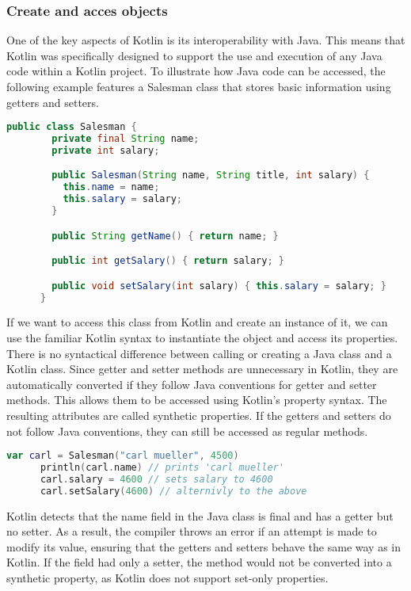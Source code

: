 \documentclass[a4paper, 11pt]{article}
\begin{document}
  \subsubsection{Create and acces objects}
    One of the key aspects of Kotlin is its interoperability with Java. This means that Kotlin was specifically designed to support the use and execution of any Java code within a Kotlin project. To illustrate how Java code can be accessed, the following example features a Salesman class that stores basic information using getters and setters.
    \begin{lstlisting}[language=Java,title={Example java class}]
      public class Salesman {
        private final String name;
        private int salary;

        public Salesman(String name, String title, int salary) {
          this.name = name;
          this.salary = salary;
        }

        public String getName() { return name; }

        public int getSalary() { return salary; }

        public void setSalary(int salary) { this.salary = salary; }
      }
    \end{lstlisting}
    If we want to access this class from Kotlin and create an instance of it, we can use the familiar Kotlin syntax to instantiate the object and access its properties. There is no syntactical difference between calling or creating a Java class and a Kotlin class. Since getter and setter methods are unnecessary in Kotlin, they are automatically converted if they follow Java conventions for getter and setter methods. This allows them to be accessed using Kotlin's property syntax. The resulting attributes are called synthetic properties. If the getters and setters do not follow Java conventions, they can still be accessed as regular methods.
    \begin{lstlisting}[language=Kotlin, title={Access the Salesman class in Kotlin}]
      var carl = Salesman("carl mueller", 4500)
      println(carl.name) // prints 'carl mueller'
      carl.salary = 4600 // sets salary to 4600
      carl.setSalary(4600) // alternivly to the above
    \end{lstlisting}
    Kotlin detects that the name field in the Java class is final and has a getter but no setter. As a result, the compiler throws an error if an attempt is made to modify its value, ensuring that the getters and setters behave the same way as in Kotlin. If the field had only a setter, the method would not be converted into a synthetic property, as Kotlin does not support set-only properties. %
\end{document}
